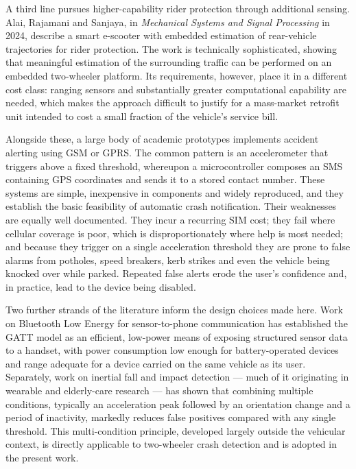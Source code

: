 \documentclass[12pt,a4paper,oneside]{report}
\begin{document}
A third line pursues higher-capability rider protection through additional sensing. Alai,
Rajamani and Sanjaya, in \textit{Mechanical Systems and Signal Processing} in 2024, describe
a smart e-scooter with embedded estimation of rear-vehicle trajectories for rider
protection. The work is technically sophisticated, showing that meaningful estimation of the
surrounding traffic can be performed on an embedded two-wheeler platform. Its requirements,
however, place it in a different cost class: ranging sensors and substantially greater
computational capability are needed, which makes the approach difficult to justify for a
mass-market retrofit unit intended to cost a small fraction of the vehicle's service bill.

Alongside these, a large body of academic prototypes implements accident alerting using
GSM or GPRS. The common pattern is an accelerometer that triggers above a fixed threshold,
whereupon a microcontroller composes an SMS containing GPS coordinates and sends it to a
stored contact number. These systems are simple, inexpensive in components and widely
reproduced, and they establish the basic feasibility of automatic crash notification.
Their weaknesses are equally well documented. They incur a recurring SIM cost; they fail
where cellular coverage is poor, which is disproportionately where help is most needed; and
because they trigger on a single acceleration threshold they are prone to false alarms from
potholes, speed breakers, kerb strikes and even the vehicle being knocked over while
parked. Repeated false alerts erode the user's confidence and, in practice, lead to the
device being disabled.

Two further strands of the literature inform the design choices made here. Work on
Bluetooth Low Energy for sensor-to-phone communication has established the GATT model as an
efficient, low-power means of exposing structured sensor data to a handset, with power
consumption low enough for battery-operated devices and range adequate for a device carried
on the same vehicle as its user. Separately, work on inertial fall and impact detection ---
much of it originating in wearable and elderly-care research --- has shown that combining
multiple conditions, typically an acceleration peak followed by an orientation change and a
period of inactivity, markedly reduces false positives compared with any single threshold.
This multi-condition principle, developed largely outside the vehicular context, is directly
applicable to two-wheeler crash detection and is adopted in the present work.
\end{document}
